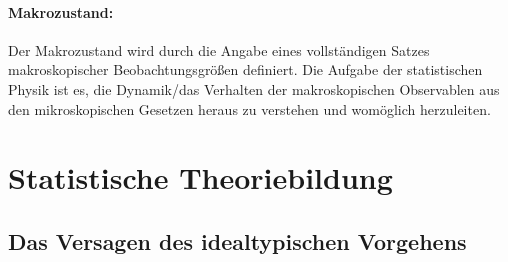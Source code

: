 \paragraph{Makrozustand:} Der Makrozustand wird durch die Angabe eines vollständigen
Satzes makroskopischer Beobachtungsgrößen definiert. Die Aufgabe der statistischen
Physik ist es, die Dynamik/das Verhalten der makroskopischen Observablen aus den
mikroskopischen Gesetzen heraus zu verstehen und womöglich herzuleiten.

    \section{Statistische Theoriebildung}
    \subsection{Das Versagen des idealtypischen Vorgehens}

